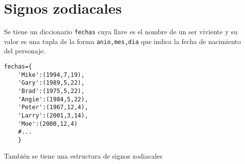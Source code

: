 \documentclass[spanish, fleqn]{scrartcl}
\begin{document}
\vspace*{.3cm}

\section{Signos zodiacales}
Se tiene un diccionario \texttt{fechas} cuya llave es el nombre de un ser viviente y su valor es una tupla de la forma \texttt{anio,mes,dia} que indica la fecha de nacimiento del personaje.

\begin{lstlisting}[style=consola]
fechas={
    'Mike':(1994,7,19),
    'Gary':(1989,5,22),
    'Brad':(1975,5,22),
    'Angie':(1984,5,22),
    'Peter':(1967,12,4),
    'Larry':(2001,3,14),
    'Moe':(2000,12,4)
    #...
    }
\end{lstlisting}

También se tiene una estructura de signos zodiacales
\end{document}
